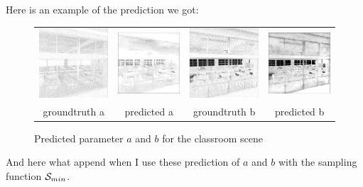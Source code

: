 \documentclass{classeENS}
\begin{document}
Here is an example of the prediction we got:
\begin{figure}[H]
    \centering
    \caption{Predicted parameter $a$ and $b$ for the classroom scene}
    \begin{tabular}{cccc}
    \includegraphics[width=35mm]{image/without/a.png}
    & \includegraphics[width=35mm]{image/without/pa.png}
    & \includegraphics[width=35mm]{image/without/b.png}
    & \includegraphics[width=35mm]{image/without/pb.png} \\
    groundtruth a & predicted a
    &groundtruth b & predicted b \\
    \end{tabular}
\end{figure}
And here what append when I use these prediction of $a$ and $b$ with the sampling
function $\mathcal S_{min}$.
\end{document}
